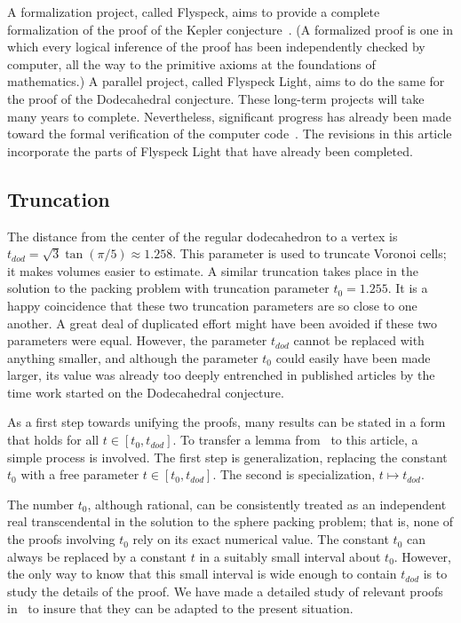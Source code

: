 \documentclass{article} %
\begin{document}
A formalization project, called Flyspeck, aims to provide a complete
formalization of the proof of the Kepler
conjecture~\cite{website:FlyspeckProject, website:FlyspeckFactSheet}.
(A formalized proof is one in which every logical inference of the
proof has been independently checked by computer, all the way to the
primitive axioms at the foundations of mathematics.) A parallel
project, called Flyspeck Light, aims to do the same for the proof of
the Dodecahedral conjecture. These long-term projects will take many
years to complete. Nevertheless, significant progress has already been
made toward the formal verification of the computer
code~\cite{Nipkow:2005:Tame,Obua:2008:Thesis}. The revisions in this
article incorporate the parts of Flyspeck Light that have already been
completed.

\subsection{Truncation}

The distance from the center of the regular dodecahedron to a vertex
is $t_{dod}=\sqrt{3}\tan(\pi/5)\approx 1.258$. This parameter is used
to truncate Voronoi cells; it makes volumes easier to estimate. A
similar truncation takes place in the solution to the packing problem
with truncation parameter $t_0 = 1.255$. It is a happy coincidence
that these two truncation parameters are so close to one another. A
great deal of duplicated effort might have been avoided if these two
parameters were equal. However, the parameter $t_{dod}$ cannot be
replaced with anything smaller, and although the parameter $t_0$ could
easily have been made larger, its value was already too deeply
entrenched in published articles by the time work started on the
Dodecahedral conjecture.

 As a first step towards unifying the proofs, many results can be
stated in a form that holds for all $t\in[t_0,t_{dod}]$. To transfer a
lemma from~\cite{Hales:2006:DCG} to this article, a simple process is
involved. The first step is generalization, replacing the constant
$t_0$ with a free parameter $t\in[t_0,t_{dod}]$. The second is
specialization, $t\mapsto t_{dod}$.

The number $t_0$, although rational, can be consistently treated as an
independent real transcendental in the solution to the sphere packing
problem; that is, none of the proofs involving $t_0$ rely on its exact
numerical value. The constant $t_0$ can always be replaced by a
constant $t$ in a suitably small interval about $t_0$. However, the
only way to know that this small interval is wide enough to contain
$t_{dod}$ is to study the details of the proof. We have made a
detailed study of relevant proofs in~\cite{Hales:2006:DCG} to insure
that they can be adapted to the present situation.
\end{document}
